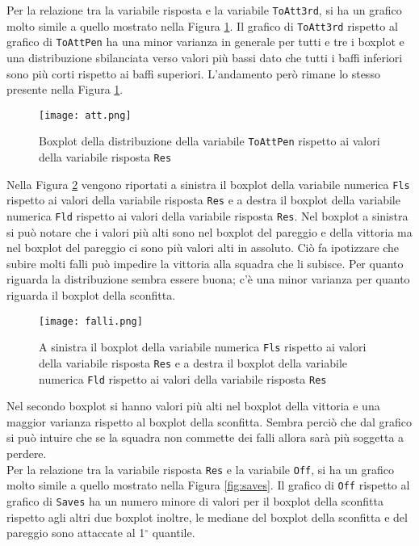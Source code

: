 Per la relazione tra la variabile risposta e la variabile \texttt{ToAtt3rd}, si ha un grafico molto simile a quello mostrato nella Figura \ref{fig:att}. Il grafico di \texttt{ToAtt3rd} rispetto al grafico di \texttt{ToAttPen} ha una minor varianza in generale per tutti e tre i boxplot e una distribuzione sbilanciata verso valori più bassi dato che tutti i baffi inferiori sono più corti rispetto ai baffi superiori. L'andamento però rimane lo stesso presente nella Figura \ref{fig:att}.\\
\begin{figure}[htbp]
	\begin{center}
		\texttt{[image: att.png]}
		\caption{Boxplot della distribuzione della variabile \texttt{ToAttPen} rispetto ai valori della variabile risposta \texttt{Res} } \label{fig:att}
	\end{center}
\end{figure}
Nella Figura \ref{fig:falli} vengono riportati a sinistra il boxplot della variabile numerica \texttt{Fls} rispetto ai valori della variabile risposta \texttt{Res} e a destra il boxplot della variabile numerica \texttt{Fld} rispetto ai valori della variabile risposta \texttt{Res}. Nel boxplot a sinistra si può notare che i valori più alti sono nel boxplot del pareggio e della vittoria ma nel boxplot del pareggio ci sono più valori alti in assoluto. Ciò fa ipotizzare che subire molti falli può impedire la vittoria alla squadra che li subisce. Per quanto riguarda la distribuzione sembra essere buona; c'è una minor varianza per quanto riguarda il boxplot della sconfitta. \\
\begin{figure}[htbp]
	\begin{center}
		\texttt{[image: falli.png]}
		\caption{A sinistra il boxplot della variabile numerica \texttt{Fls} rispetto ai valori della variabile risposta \texttt{Res} e a destra il boxplot della variabile numerica \texttt{Fld} rispetto ai valori della variabile risposta \texttt{Res}} \label{fig:falli}
	\end{center}
\end{figure}
Nel secondo boxplot si hanno valori più alti nel boxplot della vittoria e una maggior varianza rispetto al boxplot della sconfitta. Sembra perciò che dal grafico si può intuire che se la squadra non commette dei falli allora sarà più soggetta a perdere.\\
Per la relazione tra la variabile risposta \texttt{Res} e la variabile \texttt{Off}, si ha un grafico molto simile a quello mostrato nella Figura \ref{fig:saves}. Il grafico di \texttt{Off} rispetto al grafico di \texttt{Saves} ha un numero minore di valori per il boxplot della sconfitta rispetto agli altri due boxplot inoltre, le mediane del boxplot della sconfitta e del pareggio sono attaccate al 1$^{\circ}$ quantile.\\
